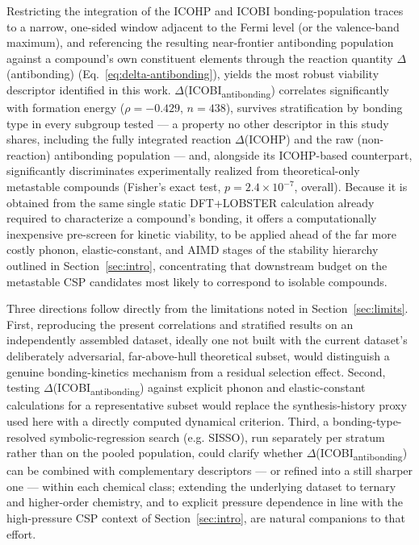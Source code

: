 \documentclass[journal=jpccck,manuscript=article]{achemso}
\begin{document}
Restricting the integration of the ICOHP and ICOBI bonding-population traces
to a narrow, one-sided window adjacent to the Fermi level (or the
valence-band maximum), and referencing the resulting near-frontier
antibonding population against a compound's own constituent elements
through the reaction quantity $\Delta$(antibonding) (Eq.~\ref{eq:delta-antibonding}),
yields the most robust viability descriptor identified in this work.
$\Delta$(ICOBI\textsubscript{antibonding}) correlates significantly with
formation energy ($\rho=-0.429$, $n=438$), survives stratification by
bonding type in every subgroup tested --- a property no other descriptor in
this study shares, including the fully integrated reaction
$\Delta$(ICOHP) and the raw (non-reaction) antibonding population --- and,
alongside its ICOHP-based counterpart, significantly discriminates
experimentally realized from theoretical-only metastable compounds
(Fisher's exact test, $p=2.4\times10^{-7}$, overall). Because it is obtained
from the same single static DFT+LOBSTER calculation already required to
characterize a compound's bonding, it offers a computationally inexpensive
pre-screen for kinetic viability, to be applied ahead of the far more
costly phonon, elastic-constant, and AIMD stages of the stability hierarchy
outlined in Section~\ref{sec:intro}, concentrating that downstream budget on
the metastable CSP candidates most likely to correspond to isolable
compounds.

Three directions follow directly from the limitations noted in
Section~\ref{sec:limits}. First, reproducing the present correlations and
stratified results on an independently assembled dataset, ideally one not
built with the current dataset's deliberately adversarial, far-above-hull
theoretical subset, would distinguish a genuine bonding-kinetics mechanism
from a residual selection effect. Second, testing
$\Delta$(ICOBI\textsubscript{antibonding}) against explicit phonon and
elastic-constant calculations for a representative subset would replace the
synthesis-history proxy used here with a directly computed dynamical
criterion. Third, a bonding-type-resolved symbolic-regression search (e.g.
SISSO), run separately per stratum rather than on the pooled population,
could clarify whether $\Delta$(ICOBI\textsubscript{antibonding}) can be
combined with complementary descriptors --- or refined into a still sharper
one --- within each chemical class; extending the underlying dataset to
ternary and higher-order chemistry, and to explicit pressure dependence in
line with the high-pressure CSP context of Section~\ref{sec:intro}, are
natural companions to that effort.
\end{document}
